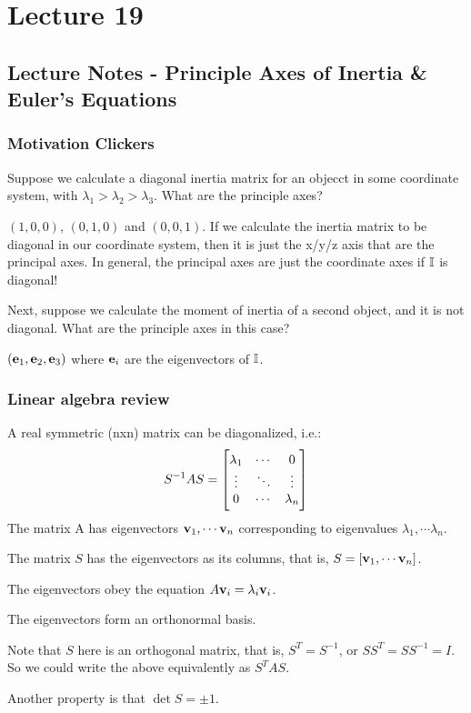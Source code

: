 \section{Lecture 19}
\subsection{Lecture Notes - Principle Axes of Inertia \& Euler's Equations}
\subsubsection{Motivation Clickers}
Suppose we calculate a diagonal inertia matrix for an objecct in some coordinate system, with $\lambda_1 > \lambda_2 > \lambda_3$. What are the principle axes?
\begin{s}
$(1, 0, 0)$, $(0, 1, 0)$ and $(0, 0, 1)$. If we calculate the inertia matrix to be diagonal in our coordinate system, then it is just the x/y/z axis that are the principal axes. In general, the principal axes are just the coordinate axes if $\mathbb{I}$ is diagonal!
\end{s}
Next, suppose we calculate the moment of inertia of a second object, and it is not diagonal. What are the principle axes in this case?
\begin{s}
$(\mathbf{e}_1, \mathbf{e}_2, \mathbf{e}_3)$ where $\mathbf{e}_i$ are the eigenvectors of $\mathbb{I}$.
\end{s}

\subsubsection{Linear algebra review}
A real symmetric (nxn) matrix can be diagonalized, i.e.:
\[S^{-1}AS = \begin{bmatrix}\lambda_1 &  \cdots &  0 \\ \vdots & \ddots & \vdots \\ 0 & \cdots & \lambda_n\end{bmatrix}\]
The matrix A has eigenvectors $\mathbf{v}_1, \cdots \mathbf{v}_n$ corresponding to eigenvalues $\lambda_1, \cdots \lambda_n$. 

The matrix $S$ has the eigenvectors as its columns, that is, $S = [\mathbf{v}_1, \cdots \mathbf{v}_n]$. 

The eigenvectors obey the equation $A\mathbf{v}_i = \lambda_i\mathbf{v}_i$. 

The eigenvectors form an orthonormal basis. 

Note that $S$ here is an orthogonal matrix, that is, $S^T = S^{-1}$, or $SS^T = SS^{-1} = I$. So we could write the above equivalently as $S^{T}AS$. 

Another property is that $\det S = \pm 1$.


